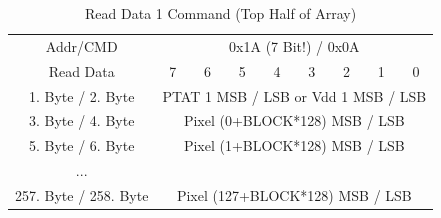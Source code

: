 \documentclass[thesis]{deutez}
\begin{document}
	\begin{table}[h!]
		\begin{center}
			\caption{Read Data 1 Command (Top Half of Array)}
			\begin{tabular}{|c|c|c|c|c|c|c|c|c|} 
				\hline
				Addr/CMD & \multicolumn{8}{c|}{0x1A (7 Bit!) / 0x0A}\\\cline{1-9}
				Read Data &7&6&5&4&3&2&1&0\\
				\cline{1-9}
				1. Byte / 2. Byte & \multicolumn{8}{c|}{PTAT 1 MSB / LSB or Vdd 1 MSB / LSB}\\\cline{1-9}
				3. Byte / 4. Byte & \multicolumn{8}{c|}{Pixel (0+BLOCK*128) MSB / LSB}\\\cline{1-9}
				5. Byte / 6. Byte & \multicolumn{8}{c|}{Pixel (1+BLOCK*128) MSB / LSB}\\\cline{1-9}
				... & \multicolumn{8}{c|}{}\\\cline{1-9}	
				257. Byte / 258. Byte & \multicolumn{8}{c|}{Pixel (127+BLOCK*128) MSB / LSB}\\\cline{1-9}
				
			\end{tabular}
		\end{center}
	\end{table}
	\FloatBarrier
\end{document}
